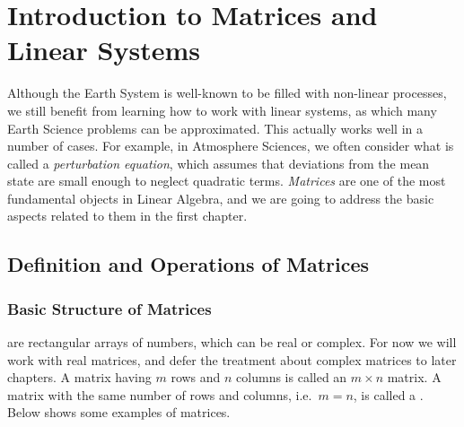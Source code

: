 \chapter{Introduction to Matrices and Linear Systems}

Although the Earth System is well-known to be filled with non-linear processes, we still benefit from learning how to work with linear systems, as which many Earth Science problems can be approximated. This actually works well in a number of cases. For example, in Atmosphere Sciences, we often consider what is called a \textit{perturbation equation}, which assumes that deviations from the mean state are small enough to neglect quadratic terms. \textit{Matrices} are one of the most fundamental objects in Linear Algebra, and we are going to address the basic aspects related to them in the first chapter.

\section{Definition and Operations of Matrices}

\subsection{Basic Structure of Matrices}
 are rectangular arrays of numbers, which can be real or complex. For now we will work with real matrices, and defer the treatment about complex matrices to later chapters. A matrix having $m$ rows and $n$ columns is called an $m \times n$ matrix. A matrix with the same number of rows and columns, i.e.\ $m = n$, is called a . Below shows some examples of matrices.

